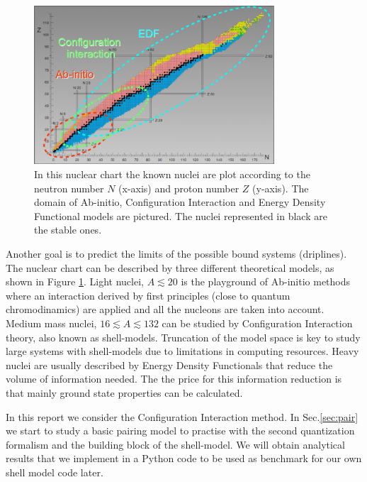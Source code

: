 \documentclass[twoside]{article}
\begin{document}

\begin{figure}[ht]
\centering
\includegraphics[width=0.8\textwidth]{nuclear_chart.pdf}
\caption{In this nuclear chart the known nuclei are plot according to the neutron number $N$ (x-axis) and proton number $Z$ (y-axis). The domain of Ab-initio, Configuration Interaction and Energy Density Functional  models are pictured. The nuclei represented in black are the stable ones.}
\label{fig: nuclear_chart}
\end{figure}
Another goal is to predict the limits of the possible bound systems (driplines). The nuclear chart can be described by three different theoretical models, as shown in Figure \ref{fig: nuclear_chart}.
Light nuclei, $A \lesssim 20$ is the playground of Ab-initio methods where an interaction derived by first principles (close to quantum chromodinamics) are applied and all the nucleons are taken into account. Medium mass nuclei, $ 16 \lesssim A \lesssim 132$ can be studied by Configuration Interaction theory, also known as shell-models. Truncation of the model space is key to study large systems with shell-models due to limitations in computing resources. Heavy nuclei are usually described by Energy Density Functionals that reduce the volume of information needed. The the price for this information reduction is that mainly ground state properties can be calculated.

In this report we consider the Configuration Interaction method. In Sec.\ref{sec:pair} we start to study a basic pairing model to practise with the second quantization formalism and the building block of the shell-model. We will obtain analytical results that we implement in a Python code to be used as benchmark for our own shell model code later.
\end{document}
